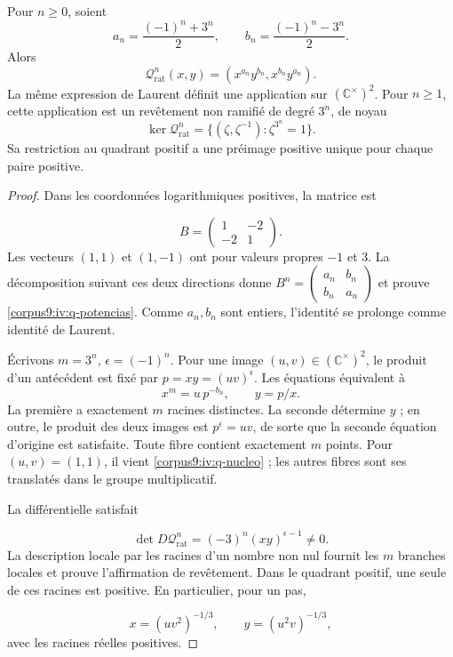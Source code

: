 \begin{proposition}
\label{corpus9:iv:q-iteracion}
Pour \(n\geq0\), soient
\[
 a_n=\frac{(-1)^n+3^n}{2},\qquad
 b_n=\frac{(-1)^n-3^n}{2}.
\]
Alors
\begin{equation}
 \mathcal Q_{\mathrm{rat}}^n(x,y)
   =(x^{a_n}y^{b_n},x^{b_n}y^{a_n}).
 \label{corpus9:iv:q-potencias}
\end{equation}
La même expression de Laurent définit une application sur
\((\mathbb C^\times)^2\). Pour \(n\geq1\), cette application est un
revêtement non ramifié de degré \(3^n\), de noyau
\begin{equation}
 \ker\mathcal Q_{\mathrm{rat}}^n
   =\{(\zeta,\zeta^{-1}):\zeta^{3^n}=1\}.
 \label{corpus9:iv:q-nucleo}
\end{equation}
Sa restriction au quadrant positif a une préimage positive
unique pour chaque paire positive.
\end{proposition}
\begin{proof}
Dans les coordonnées logarithmiques positives, la matrice est

\[
 B=\begin{pmatrix}1&-2\\-2&1\end{pmatrix}.
\]
Les vecteurs \((1,1)\) et \((1,-1)\) ont pour valeurs propres
\(-1\) et \(3\). La décomposition suivant ces deux directions donne
\(B^n=\left(
\begin{smallmatrix}a_n&b_n\\b_n&a_n\end{smallmatrix}\right)\)
et prouve \eqref{corpus9:iv:q-potencias}. Comme \(a_n,b_n\) sont
entiers, l’identité se prolonge comme identité de Laurent.


Écrivons \(m=3^n\), \(\epsilon=(-1)^n\). Pour une image
\((u,v)\in(\mathbb C^\times)^2\), le produit d’un antécédent
est fixé par \(p=xy=(uv)^\epsilon\). Les équations équivalent à
\[
 x^m=u\,p^{-b_n},\qquad y=p/x.
\]
La première a exactement \(m\) racines distinctes. La seconde
détermine \(y\) ; en outre, le produit des deux images est
\(p^\epsilon=uv\), de sorte que la seconde équation d’origine est
satisfaite. Toute fibre contient exactement \(m\) points. Pour
\((u,v)=(1,1)\), il vient \eqref{corpus9:iv:q-nucleo} ; les autres
fibres sont ses translatés dans le groupe multiplicatif.

La différentielle satisfait

\[
 \det D\mathcal Q_{\mathrm{rat}}^n
   =(-3)^n(xy)^{\epsilon-1}\ne0.
\]
La description locale par les racines d’un nombre non nul fournit
les \(m\) branches locales et prouve l’affirmation de revêtement.
Dans le quadrant positif, une seule de ces racines est positive.
En particulier, pour un pas,

\[
 x=(uv^2)^{-1/3},\qquad y=(u^2v)^{-1/3},
\]
avec les racines réelles positives.
\end{proof}

